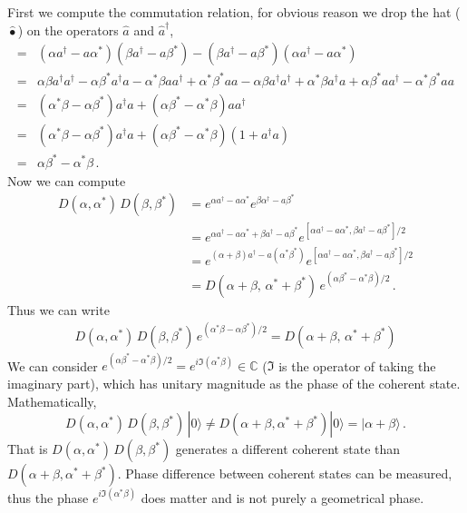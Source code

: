 \documentclass[11pt, oneside]{book}
\theoremstyle{break}
\theoremstyle{break}
\newcommand{\C}{\mathbb{C}}
\begin{document}
\chapter{}
First we compute the commutation relation, for obvious reason we drop the hat ($\hat{•}$) on the operators $\hat{a}$ and $\hat{a}^\dagger$, 
\begin{align*}
[\alpha a^\dagger - a \alpha^* , \beta a^\dagger - a \beta^*]=& 
(\alpha a^\dagger - a \alpha^*)
(\beta a^\dagger - a \beta^*)
-
(\beta a^\dagger - a \beta^*)
(\alpha a^\dagger - a \alpha^*)\\
=& \alpha\beta a^\dagger a^\dagger - \alpha\beta^* a^\dagger a - \alpha^*\beta aa^\dagger + \alpha^*\beta^* aa - \alpha\beta a^\dagger a^\dagger+\alpha^*\beta a^\dagger a+ \alpha\beta^* aa^\dagger -\alpha^*\beta^*aa\\
=& (\alpha^* \beta -\alpha\beta^*)a^\dagger a + (\alpha\beta^* - \alpha^*\beta)aa^\dagger \\
=& (\alpha^* \beta -\alpha\beta^*)a^\dagger a + (\alpha\beta^* - \alpha^*\beta)(1+a^\dagger a) \\
=&\alpha\beta^* - \alpha^*\beta\,.
\end{align*}
Now we can compute
\begin{align*}
D(\alpha,\alpha^*)\, D(\beta, \beta^*) 
&= e^{\alpha a^\dagger  - a\alpha^*} e^{\beta \alpha^\dagger - a\beta^*}\\
&= e^{\alpha a^{\dagger} - a\alpha^{*} + \beta a^\dagger - a\beta^*}e^{[\alpha a^\dagger - a \alpha^* , \beta a^\dagger - a \beta^*]/2}\\
&= e^{(\alpha+\beta)a^\dagger - a(\alpha^*\beta^*)}e^{[\alpha a^\dagger - a \alpha^* , \beta a^\dagger - a \beta^*]/2}\\
&= D(\alpha+\beta, \, \alpha^*+\beta^*) \,e^{(\alpha\beta^* - \alpha^*\beta)/2}\,.
\end{align*}
Thus we can write
\begin{align*}
D(\alpha,\alpha^*)\, D(\beta, \beta^*)\,e^{(\alpha^*\beta-\alpha\beta^* )/2} = D(\alpha+\beta, \, \alpha^*+\beta^*)
\end{align*}
We can consider $e^{(\alpha\beta^* - \alpha^*\beta)/2} = e^{i\Im(\alpha^*\beta)} \in \C$ ($\Im$ is the operator of taking the imaginary part), which has unitary magnitude as the phase of the coherent state. Mathematically, 
$$ D(\alpha, \alpha^*)\, D(\beta, \beta^*)\, |0\rangle \neq D(\alpha+\beta, \alpha^*+\beta^*) |0\rangle = |\alpha+\beta\rangle\,.$$ 
That is $D(\alpha, \alpha^*)\, D(\beta, \beta^*)$ generates a different coherent state than $D(\alpha+\beta, \alpha^*+\beta^*)$. Phase difference between coherent states can be measured, thus the phase $e^{i\Im(\alpha^*\beta)}$ does matter and is not purely a geometrical phase. 
\end{document}
